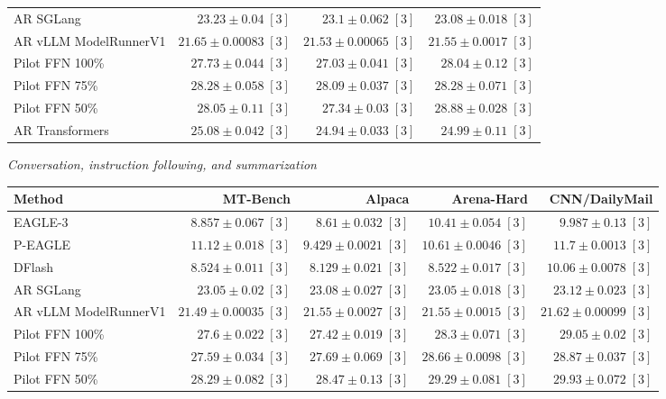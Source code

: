 \begin{table}[!htp]
\begin{tabular}{@{}>{\raggedright\arraybackslash}p{3.7cm}rrr@{}}
AR \textperiodcentered{} SGLang & \(23.23 \pm 0.04\;[3]\) & \(23.1 \pm 0.062\;[3]\) & \(23.08 \pm 0.018\;[3]\) \\
AR \textperiodcentered{} vLLM ModelRunnerV1 & \(21.65 \pm 0.00083\;[3]\) & \(21.53 \pm 0.00065\;[3]\) & \(21.55 \pm 0.0017\;[3]\) \\
Pilot FFN 100\% & \(27.73 \pm 0.044\;[3]\) & \(27.03 \pm 0.041\;[3]\) & \(28.04 \pm 0.12\;[3]\) \\
Pilot FFN 75\% & \(28.28 \pm 0.058\;[3]\) & \(28.09 \pm 0.037\;[3]\) & \(28.28 \pm 0.071\;[3]\) \\
Pilot FFN 50\% & \(28.05 \pm 0.11\;[3]\) & \(27.34 \pm 0.03\;[3]\) & \(28.88 \pm 0.028\;[3]\) \\
AR \textperiodcentered{} Transformers & \(25.08 \pm 0.042\;[3]\) & \(24.94 \pm 0.033\;[3]\) & \(24.99 \pm 0.11\;[3]\) \\
\bottomrule
\end{tabular}\par\medskip
\textit{Conversation, instruction following, and summarization}\par\smallskip
\begin{tabular}{@{}>{\raggedright\arraybackslash}p{3.7cm}rrrr@{}}
\toprule
Method & MT-Bench & Alpaca & Arena-Hard & CNN/DailyMail \\
\midrule
EAGLE-3 & \(8.857 \pm 0.067\;[3]\) & \(8.61 \pm 0.032\;[3]\) & \(10.41 \pm 0.054\;[3]\) & \(\mathbf{9.987} \pm 0.13\;[3]\) \\
P-EAGLE & \(11.12 \pm 0.018\;[3]\) & \(9.429 \pm 0.0021\;[3]\) & \(10.61 \pm 0.0046\;[3]\) & \(11.7 \pm 0.0013\;[3]\) \\
DFlash & \(\mathbf{8.524} \pm 0.011\;[3]\) & \(\mathbf{8.129} \pm 0.021\;[3]\) & \(\mathbf{8.522} \pm 0.017\;[3]\) & \(10.06 \pm 0.0078\;[3]\) \\
AR \textperiodcentered{} SGLang & \(23.05 \pm 0.02\;[3]\) & \(23.08 \pm 0.027\;[3]\) & \(23.05 \pm 0.018\;[3]\) & \(23.12 \pm 0.023\;[3]\) \\
AR \textperiodcentered{} vLLM ModelRunnerV1 & \(21.49 \pm 0.00035\;[3]\) & \(21.55 \pm 0.0027\;[3]\) & \(21.55 \pm 0.0015\;[3]\) & \(21.62 \pm 0.00099\;[3]\) \\
Pilot FFN 100\% & \(27.6 \pm 0.022\;[3]\) & \(27.42 \pm 0.019\;[3]\) & \(28.3 \pm 0.071\;[3]\) & \(29.05 \pm 0.02\;[3]\) \\
Pilot FFN 75\% & \(27.59 \pm 0.034\;[3]\) & \(27.69 \pm 0.069\;[3]\) & \(28.66 \pm 0.0098\;[3]\) & \(28.87 \pm 0.037\;[3]\) \\
Pilot FFN 50\% & \(28.29 \pm 0.082\;[3]\) & \(28.47 \pm 0.13\;[3]\) & \(29.29 \pm 0.081\;[3]\) & \(29.93 \pm 0.072\;[3]\) \\

\end{tabular}
\end{table}
